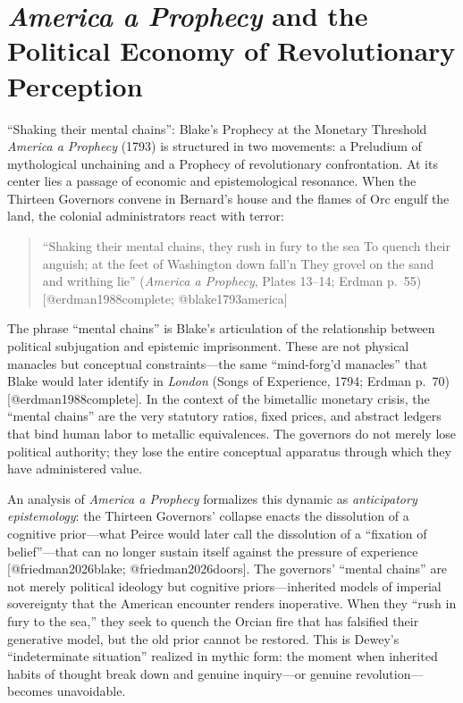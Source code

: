\documentclass[
  ignorenonframetext,
]{beamer}
\author{\texorpdfstring{}{}}
\date{}
\begin{document}
\section{\texorpdfstring{\emph{America a Prophecy} and the Political
Economy of Revolutionary
Perception}{America a Prophecy and the Political Economy of Revolutionary Perception}}\label{america-a-prophecy-and-the-political-economy-of-revolutionary-perception}

\begin{frame}{``Shaking their mental chains'': Blake's Prophecy at the
Monetary Threshold}
\protect{}\label{shaking-their-mental-chains-blakes-prophecy-at-the-monetary-threshold}
\emph{America a Prophecy} (1793) is structured in two movements: a
Preludium of mythological unchaining and a Prophecy of revolutionary
confrontation. At its center lies a passage of economic and
epistemological resonance. When the Thirteen Governors convene in
Bernard's house and the flames of Orc engulf the land, the colonial
administrators react with terror:

\begin{quote}
``Shaking their mental chains, they rush in fury to the sea To quench
their anguish; at the feet of Washington down fall'n They grovel on the
sand and writhing lie'' (\emph{America a Prophecy}, Plates 13--14;
Erdman p.~55) {[}@erdman1988complete; @blake1793america{]}
\end{quote}

The phrase ``mental chains'' is Blake's articulation of the relationship
between political subjugation and epistemic imprisonment. These are not
physical manacles but conceptual constraints---the same ``mind-forg'd
manacles'' that Blake would later identify in \emph{London} (Songs of
Experience, 1794; Erdman p.~70) {[}@erdman1988complete{]}. In the
context of the bimetallic monetary crisis, the ``mental chains'' are the
very statutory ratios, fixed prices, and abstract ledgers that bind
human labor to metallic equivalences. The governors do not merely lose
political authority; they lose the entire conceptual apparatus through
which they have administered value.

An analysis of \emph{America a Prophecy} formalizes this dynamic as
\emph{anticipatory epistemology}: the Thirteen Governors' collapse
enacts the dissolution of a cognitive prior---what Peirce would later
call the dissolution of a ``fixation of belief''---that can no longer
sustain itself against the pressure of experience {[}@friedman2026blake;
@friedman2026doors{]}. The governors' ``mental chains'' are not merely
political ideology but cognitive priors---inherited models of imperial
sovereignty that the American encounter renders inoperative. When they
``rush in fury to the sea,'' they seek to quench the Orcian fire that
has falsified their generative model, but the old prior cannot be
restored. This is Dewey's ``indeterminate situation'' realized in mythic
form: the moment when inherited habits of thought break down and genuine
inquiry---or genuine revolution---becomes unavoidable.
\end{frame}
\end{document}
